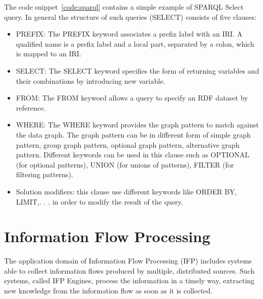 The code snippet~\ref{code:sparql} contains a simple example of SPARQL Select query. In general the structure of such queries (SELECT) consists of five clauses:
\begin{itemize}
\item PREFIX: The PREFIX keyword associates a prefix label with an IRI. A qualified name is a prefix label and a local part, separated by a colon, which is mapped to an IRI.
\item SELECT: The SELECT keyword specifies the form of returning variables and their combinations by introducing new variable.
\item FROM: The FROM keyword allows a query to specify an RDF dataset by reference.
\item WHERE: The WHERE keyword provides the graph pattern to match against the data graph. The graph pattern can be in different form of simple graph pattern, group graph pattern, optional graph pattern, alternative graph pattern. Different keywords can be used in this clause such as OPTIONAL (for optional patterns), UNION (for unions of patterns), FILTER (for filtering patterns).
\item Solution modifiers: this clause use different keywords like ORDER BY, LIMIT,. . . in order to modify the result of the query.
\end{itemize}

\pagebreak

\section{Information Flow Processing}\label{sec:ifp}

The application domain of Information Flow Processing (IFP) includes systems able to collect information flows produced by multiple, distributed sources. Such systems, called IFP Engines, process the information in a timely way, extracting new knowledge from the information flow as soon as it is collected.

